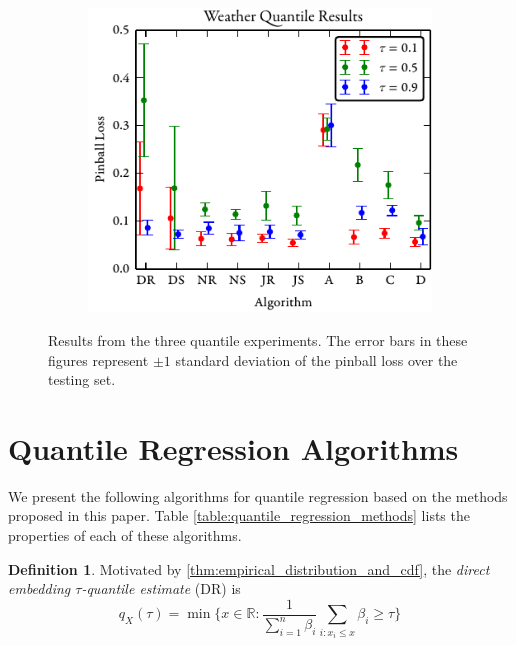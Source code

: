 \documentclass[twoside]{article} \usepackage{aistats2017}
\theoremstyle{definition}
\newtheorem{definition}{Definition}[section]
\theoremstyle{theorem}
\newcommand{\rv}[1]{{#1}}
\begin{document}
\begin{figure}[t]
		\begin{subfigure}[b]{0.32\textwidth}
			\includegraphics[width=\textwidth]{figures/Weather_results}
		\end{subfigure}
		\caption{Results from the three quantile experiments. The error bars in these figures represent $\pm 1$ standard deviation of the pinball loss over the testing set.}
		\label{fig:qfull}
	\end{figure}

\section{Quantile Regression Algorithms}
\label{sec:quantile_regression_algorithms}
	
	We present the following algorithms for quantile regression based on the methods proposed in this paper. Table \ref{table:quantile_regression_methods} lists the properties of each of these algorithms.

	\theoremstyle{definition}
	\begin{definition}
		Motivated by \cref{thm:empirical_distribution_and_cdf}, the \textit{direct embedding $\tau$-quantile estimate} (DR) is
		\begin{equation}
		q_{\rv{X}}(\tau) = \min\{x \in \mathbb{R} : \frac{1}{\sum_{i = 1}^{n} \beta_{i}} \sum_{i : x_{i} \leq x} \beta_{i} \geq \tau\}
		\end{equation}	
	\end{definition}
	
\end{document}
